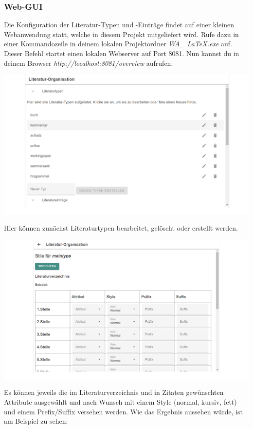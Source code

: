 \documentclass[12pt]{article}
\begin{document}
\subsubsection{Web-GUI}
Die Konfiguration der Literatur-Typen und -Einträge findet auf einer kleinen Webanwendung statt, welche in diesem Projekt mitgeliefert wird. Rufe dazu in einer Kommandozeile in deinem lokalen Projektordner \textit{WA\_ LaTeX.exe} auf. Dieser Befehl startet einen lokalen Webserver auf Port 8081. Nun kannst du in deinem Browser \textit{http://localhost:8081/overview} aufrufen:
\begin{center}
\includegraphics[width=\textwidth]{dokuImages/gui1.png}
\end{center}
Hier können zunächst Literaturtypen bearbeitet, gelöscht oder erstellt werden.
\begin{center}
\includegraphics[width=\textwidth]{dokuImages/gui_2.png}
\end{center}
Es können jeweils die im Literaturverzeichnis und in Zitaten gewünschten Attribute ausgewählt und nach Wunsch mit einem Style (normal, kursiv, fett) und einem Prefix/Suffix versehen werden. Wie das Ergebnis aussehen würde, ist am Beispiel zu sehen:
\end{document}
